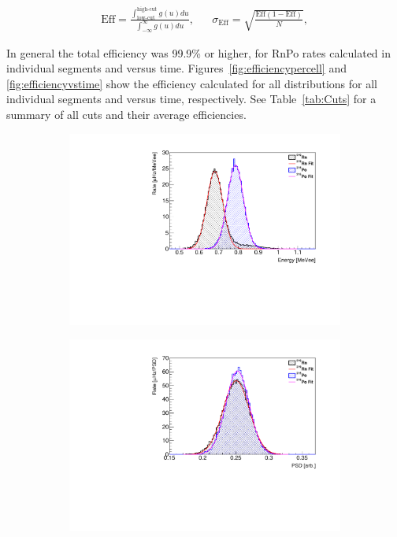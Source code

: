 \begin{align}
	\text{Eff} = \frac{\int_{\text{low-cut}}^{\text{high-cut}}g(u) du}{\int_{-\infty}^{\infty}g(u) du},
	&& \sigma_{\text{Eff}} =\sqrt{\frac{\text{Eff}(1-\text{Eff})}{N}},
	\label{eq:Eff}
\end{align}	

In general the total efficiency was 99.9\% or higher, for RnPo rates calculated in individual segments and versus time.
Figures~\ref{fig:efficiencypercell} and \ref{fig:efficiencyvstime} show the efficiency calculated for all distributions for all individual segments and versus time, respectively.
See Table~\ref{tab:Cuts} for a summary of all cuts and their average efficiencies.

\begin{figure}[H]
	\begin{subfigure}{0.5\linewidth}
	\centering
	\includegraphics[width=0.95\linewidth]{tex/6-ac227-images/AD_RateCalc/RnPoEn_Seg76}
	\caption{}
	\label{fig:rnpoenseg76}
\end{subfigure}%
\begin{subfigure}{0.5\linewidth}
	\centering
	\includegraphics[width=0.95\linewidth]{tex/6-ac227-images/AD_RateCalc/RnPoPSD_Seg76}

\end{subfigure}
\end{figure}
